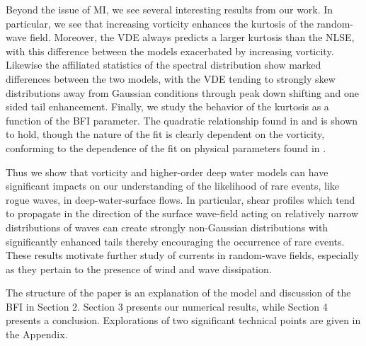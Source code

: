\documentclass[a4paper,11pt]{article}
\begin{document}
Beyond the issue of MI, we see several interesting results from our work.  In particular, we see that increasing vorticity enhances the kurtosis of the random-wave field.  Moreover, the VDE always predicts a larger kurtosis than the NLSE, with this difference between the models exacerbated by increasing vorticity.  Likewise the affiliated statistics of the spectral distribution show marked differences between the two models, with the VDE tending to strongly skew distributions away from Gaussian conditions through peak down shifting and one sided tail enhancement.  Finally, we study the behavior of the kurtosis as a function of the BFI parameter.  The quadratic relationship found in \cite{janssen} and \cite{eeltink} is shown to hold, though the nature of the fit is clearly dependent on the vorticity, conforming to the dependence of the fit on physical parameters found in \cite{eeltink}.

 Thus we show that vorticity and higher-order deep water models can have significant impacts on our understanding of the likelihood of rare events, like rogue waves, in deep-water-surface flows.  In particular, shear profiles which tend to propagate in the direction of the surface wave-field acting on relatively narrow distributions of waves can create strongly non-Gaussian distributions with significantly enhanced tails thereby encouraging the occurrence of rare events.  These results motivate further study of currents in random-wave fields, especially as they pertain to the presence of wind and wave dissipation.  

The structure of the paper is an explanation of the model and discussion of the BFI in Section 2.  Section 3 presents our numerical results, while Section 4 presents a conclusion.  Explorations of two significant technical points are given in the Appendix.  
\end{document}
